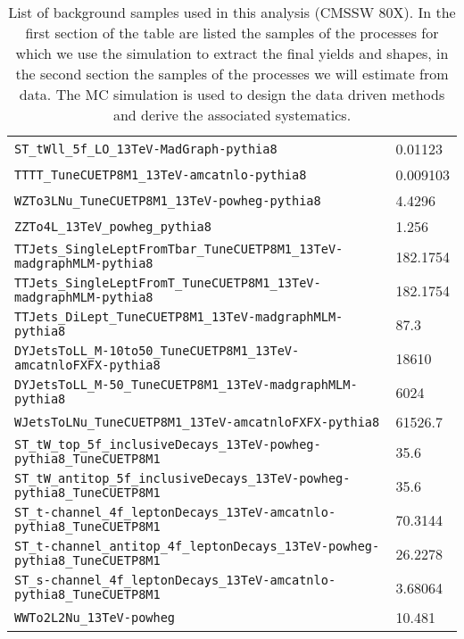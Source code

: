 \begin{table}
\begin{tabular}{ll}
    \verb|ST_tWll_5f_LO_13TeV-MadGraph-pythia8|                                   & 0.01123 \\
    \verb|TTTT_TuneCUETP8M1_13TeV-amcatnlo-pythia8|                               & 0.009103 \\
    \verb|WZTo3LNu_TuneCUETP8M1_13TeV-powheg-pythia8|                             & 4.4296 \\
    \verb|ZZTo4L_13TeV_powheg_pythia8|                                            & 1.256 \\ \hline
    \verb|TTJets_SingleLeptFromTbar_TuneCUETP8M1_13TeV-madgraphMLM-pythia8|       & 182.1754 \\
    \verb|TTJets_SingleLeptFromT_TuneCUETP8M1_13TeV-madgraphMLM-pythia8|          & 182.1754 \\
    \verb|TTJets_DiLept_TuneCUETP8M1_13TeV-madgraphMLM-pythia8|                   & 87.3 \\
    \verb|DYJetsToLL_M-10to50_TuneCUETP8M1_13TeV-amcatnloFXFX-pythia8|            & 18610 \\
    \verb|DYJetsToLL_M-50_TuneCUETP8M1_13TeV-madgraphMLM-pythia8|                 & 6024 \\
    \verb|WJetsToLNu_TuneCUETP8M1_13TeV-amcatnloFXFX-pythia8|                     & 61526.7 \\
    \verb|ST_tW_top_5f_inclusiveDecays_13TeV-powheg-pythia8_TuneCUETP8M1|         & 35.6 \\
    \verb|ST_tW_antitop_5f_inclusiveDecays_13TeV-powheg-pythia8_TuneCUETP8M1|     & 35.6 \\
    \verb|ST_t-channel_4f_leptonDecays_13TeV-amcatnlo-pythia8_TuneCUETP8M1|       & 70.3144\\
    \verb|ST_t-channel_antitop_4f_leptonDecays_13TeV-powheg-pythia8_TuneCUETP8M1| & 26.2278\\
    \verb|ST_s-channel_4f_leptonDecays_13TeV-amcatnlo-pythia8_TuneCUETP8M1|       & 3.68064 \\
    \verb|WWTo2L2Nu_13TeV-powheg|                                                 & 10.481 \\\hline
  \end{tabular}
  \caption[List of background samples used in this analysis (CMSSW 80X).]{List of background samples used in this analysis (CMSSW 80X). In the first section of the table are listed the samples of the processes for which we use the simulation to extract the final yields and shapes, in the second section the samples of the processes we will estimate from data. The MC simulation is used to design the data driven methods and derive the associated systematics.} \label{tab:bgsamples}
\end{table}

